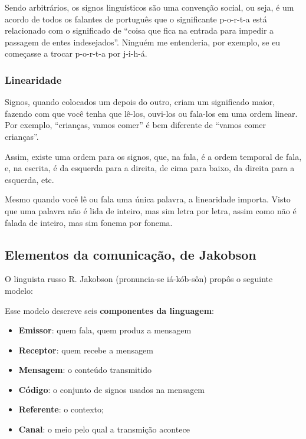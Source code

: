 \documentclass{article}
\begin{document}
Sendo arbitrários, os signos linguísticos são uma convenção social, ou seja, é um acordo de todos os falantes de português que o significante p-o-r-t-a está relacionado com o significado de ``coisa que fica na entrada para impedir a passagem de entes indesejados''. Ninguém me entenderia, por exemplo, se eu começasse a trocar \mbox{p-o-r-t-a} por \mbox{j-i-h-á}.

\subsubsection{Linearidade}
Signos, quando colocados um depois do outro, criam um significado maior, fazendo com que você tenha que lê-los, ouvi-los ou fala-los em uma ordem linear. Por exemplo, ``crianças, vamos comer'' é bem diferente de ``vamos comer crianças''.

Assim, existe uma ordem para os signos, que, na fala, é a ordem temporal de fala, e, na escrita, é da esquerda para a direita, de cima para baixo, da direita para a esquerda, etc.

Mesmo quando você lê ou fala uma única palavra, a linearidade importa. Visto que uma palavra não é lida de inteiro, mas sim letra por letra, assim como não é falada de inteiro, mas sim fonema por fonema.

\subsection{Elementos da comunicação, de Jakobson}
O linguista russo R. Jakobson (pronuncia-se iá-kób-sôn) propôs o seguinte modelo:


Esse modelo descreve seis \textbf{componentes da linguagem}:
\begin{itemize}
    \item {\textbf{Emissor}: quem fala, quem produz a mensagem}
    \item {\textbf{Receptor}: quem recebe a mensagem}
    \item {\textbf{Mensagem}: o conteúdo transmitido}
    \item {\textbf{Código}: o conjunto de signos usados na mensagem}
    \item {\textbf{Referente}: o contexto;}
    \item {\textbf{Canal}: o meio pelo qual a transmição acontece}
\end{itemize}
\end{document}
